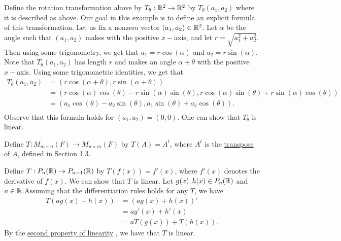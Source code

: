 \begin{eg}[Rotations]
    Define the rotation transformation above by \( T_{\theta}: \mathbb{R}^{2} \to \mathbb{R}^{2}  \) by \( T_{\theta}(a_{1}, a_{2}) \) where it is described as above. Our goal in this example is to define an explicit formula of this transformation. Let us fix a nonzero vector \( (a_{1}, a_{2}) \in \mathbb{R}^{2} \). Let \( \alpha  \) be the angle such that \( (a_{1}, a_{2})\) makes with the positive \( x-\)axis, and let \( r = \sqrt{ a_{1}^{2} + a_{2}^{2}  }  \). Then using some trigonometry, we get that \( a_{1} = r \cos(\alpha)  \) and \( a_{2} = r \sin(\alpha) \). Note that \( T_{\theta}(a_{1}, a_{2}) \) has length \( r  \) and makes an angle \( \alpha + \theta  \) with the positive \( x- \)axis. Using some trigonometric identities, we get that
    \begin{align*}
        T_{\theta}(a_{1}, a_{2}) &= (r\cos(\alpha + \theta), r \sin(\alpha + \theta)) \\
                                 &= (r \cos(\alpha) \cos(\theta) - r \sin(\alpha ) \sin(\theta) , r \cos(\alpha) \sin(\theta) + r \sin(\alpha) \cos(\theta) ) \\
                                 &= (a_{1} \cos(\theta) - a_{2} \sin(\theta) , a_{1} \sin(\theta) + a_{2} \cos(\theta)).  \\
    \end{align*}
    Observe that this formula holds for \( (a_{1}, a_{2}) = (0,0) \). One can show that \( T_{\theta}  \) is linear.
\end{eg}

\begin{eg}[Transpose]
    Define \( T: M_{m \times n } (F) \to M_{n \times m}(F) \) by \( T(A) = A^{t}  \), where \( A^{t} \) is the {\hyperref[Transpose]{transpose}}  of \( A  \), defined in Section 1.3. 
\end{eg}

\begin{eg}
    Define \( T: P_{n}(\mathbb{R}) \to P_{n-1}(\mathbb{R}) \) by \( T(f(x)) = f'(x)  \), where \( f'(x)  \) denotes the derivative of \( f(x)  \). We can show that \( T  \) is linear. Let \( g(x) , h(x) \in P_{n}(\mathbb{R}) \) and \( a \in \mathbb{R}  \).Assuming that the differentiation rules holds for any \( T  \), we have
    \begin{align*}
        T(ag(x) + h(x)) &= (ag(x) + h(x))' \\
                        &= ag'(x) + h'(x) \\
                        &= a T(g(x)) + T(h(x)).
    \end{align*}
    By the {\hyperref[Second Property of Linearity]{second property of linearity}} , we have that \( T  \) is linear.
\end{eg}

